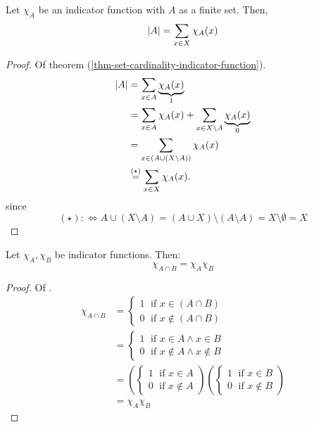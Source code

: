\begin{thm}\label{thm-set-cardinality-indicator-function}
    Let $\chi_A$ be an indicator function with $A$ as a finite set. Then,
    \begin{equation*}
        \lvert A\rvert = \sum_{x \in X} \chi_A(x)
    \end{equation*}
\end{thm}

\begin{proof}
    Of theorem (\ref{thm-set-cardinality-indicator-function}).
    \begin{align*}
        \lvert A\rvert &=\sum_{x\in A}\underbrace{\chi_A(x)}_{1}\\
                &=\sum_{x\in A}\chi_A(x)+\sum_{x\in X\setminus A}\underbrace{\chi_A(x)}_{0}\\
                &=\sum_{x\in (A\cup (X\setminus A))}\chi_A(x)\\
                &\overset{(\star)}{=}\sum_{x\in X}\chi_A(x).
    \end{align*}
    since 
    \begin{equation*}
        (\star) :\Leftrightarrow A\cup(X\setminus A)=(A\cup X)\setminus(A\setminus A)=X\setminus \emptyset=X
    \end{equation*}
\end{proof}

\begin{thm}\label{thm-cap-indicator-function}
    Let $\chi_A,\chi_B$ be indicator functions. Then:
    \begin{equation*}
        \chi_{A \cap B} = \chi_A\chi_B
    \end{equation*}
\end{thm}

\begin{proof}
    Of .
    \begin{align*}
        \chi_{A \cap B} &= \begin{cases}
            1\;\text{ if } x \in (A \cap B)\\
            0\;\text{ if } x \notin (A \cap B)
        \end{cases}\\
        &= \begin{cases}
            1\;\text{ if } x \in A \land x \in B\\
            0\;\text{ if } x \notin A \land x \notin B
        \end{cases}\\
        &= \left(\begin{cases}
            1\;\text{ if } x \in A\\
            0\;\text{ if } x \notin A
        \end{cases}\right)\left(\begin{cases}
            1\;\text{ if } x \in B\\
            0\;\text{ if } x \notin B
        \end{cases}\right)\\
        &= \chi_A\chi_B
    \end{align*}
\end{proof}

